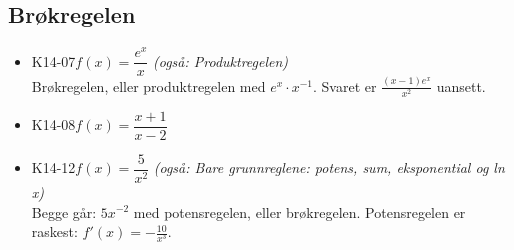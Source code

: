 \documentclass[11pt,a4paper]{article}
\begin{document}
\subsection*{Brøkregelen}
\begin{itemize}[leftmargin=1.2em, itemsep=0.35em]
\item \textsf{\small K14-07}\quad $f(x) = \dfrac{e^x}{x}$ \emph{(også: Produktregelen)}\\{\small\color{dempet}Brøkregelen, eller produktregelen med $e^x \cdot x^{-1}$. Svaret er $\frac{(x - 1)e^x}{x^2}$ uansett.}
\item \textsf{\small K14-08}\quad $f(x) = \dfrac{x + 1}{x - 2}$
\item \textsf{\small K14-12}\quad $f(x) = \dfrac{5}{x^2}$ \emph{(også: Bare grunnreglene: potens, sum, eksponential og ln x)}\\{\small\color{dempet}Begge går: $5x^{-2}$ med potensregelen, eller brøkregelen. Potensregelen er raskest: $f'(x) = -\frac{10}{x^3}$.}
\end{itemize}
\end{document}
